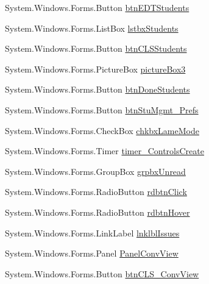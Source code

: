 \begin{DoxyCompactItemize}
\-System.\-Windows.\-Forms.\-Button \hyperlink{class_sr_p___classroom_inq_1_1frm_classrrom_inq_a527ceba70a2003fe9550f3fb3e307999}{btn\-E\-D\-T\-Students}
\item 
\-System.\-Windows.\-Forms.\-List\-Box \hyperlink{class_sr_p___classroom_inq_1_1frm_classrrom_inq_a0c67f5e900e579981b753ac9853a5141}{lstbx\-Students}
\item 
\-System.\-Windows.\-Forms.\-Button \hyperlink{class_sr_p___classroom_inq_1_1frm_classrrom_inq_a0aed8d1ecf711f52b3a948fdeae6ac5b}{btn\-C\-L\-S\-Students}
\item 
\-System.\-Windows.\-Forms.\-Picture\-Box \hyperlink{class_sr_p___classroom_inq_1_1frm_classrrom_inq_a1320c0263001c5045f415d68935ae50e}{picture\-Box3}
\item 
\-System.\-Windows.\-Forms.\-Button \hyperlink{class_sr_p___classroom_inq_1_1frm_classrrom_inq_a9225d189a561ae3a5b9f68ca3c004351}{btn\-Done\-Students}
\item 
\-System.\-Windows.\-Forms.\-Button \hyperlink{class_sr_p___classroom_inq_1_1frm_classrrom_inq_af14017019a644ec6c1d32d49fb0e59f1}{btn\-Stu\-Mgmt\-\_\-\-Prefs}
\item 
\-System.\-Windows.\-Forms.\-Check\-Box \hyperlink{class_sr_p___classroom_inq_1_1frm_classrrom_inq_ae2a9d3b663f7c88374a93c3cd9ef6eca}{chkbx\-Lame\-Mode}
\item 
\-System.\-Windows.\-Forms.\-Timer \hyperlink{class_sr_p___classroom_inq_1_1frm_classrrom_inq_aa53f33f4a7245799242c52b4ceff8dab}{timer\-\_\-\-Controls\-Create}
\item 
\-System.\-Windows.\-Forms.\-Group\-Box \hyperlink{class_sr_p___classroom_inq_1_1frm_classrrom_inq_a0e65b517d6f3d5bc8e159ff6283dc508}{grpbx\-Unread}
\item 
\-System.\-Windows.\-Forms.\-Radio\-Button \hyperlink{class_sr_p___classroom_inq_1_1frm_classrrom_inq_a116a0f948fdc7187ae7dc028026eec59}{rdbtn\-Click}
\item 
\-System.\-Windows.\-Forms.\-Radio\-Button \hyperlink{class_sr_p___classroom_inq_1_1frm_classrrom_inq_a2bee4d450744662c189d99c17658dac7}{rdbtn\-Hover}
\item 
\-System.\-Windows.\-Forms.\-Link\-Label \hyperlink{class_sr_p___classroom_inq_1_1frm_classrrom_inq_a814cf817eced89d772f9cba1053bf81b}{lnklbl\-Issues}
\item 
\-System.\-Windows.\-Forms.\-Panel \hyperlink{class_sr_p___classroom_inq_1_1frm_classrrom_inq_ae5d62ffd766ae877bf37d56567d836d5}{\-Panel\-Conv\-View}
\item 
\-System.\-Windows.\-Forms.\-Button \hyperlink{class_sr_p___classroom_inq_1_1frm_classrrom_inq_a2e74908e00f7502b511e8726d1574d7e}{btn\-C\-L\-S\-\_\-\-Conv\-View}

\end{DoxyCompactItemize}
